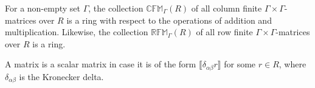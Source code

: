 For a non-empty set $\Gamma$, the collection $\mathbb{CFM}_{\Gamma}(R)$ of all column finite $\Gamma \times \Gamma$-matrices over $R$ is a ring with respect to the operations of addition and multiplication. Likewise, the collection $\mathbb{RFM}_{\Gamma}(R)$ of all row finite $\Gamma \times \Gamma$-matrices over $R$ is a ring.

A matrix is a scalar matrix in case it is of the form $\llbracket \delta_{\alpha\beta} r \rrbracket$ for some $r \in R$, where $\delta_{\alpha\beta}$ is the Kronecker delta.
